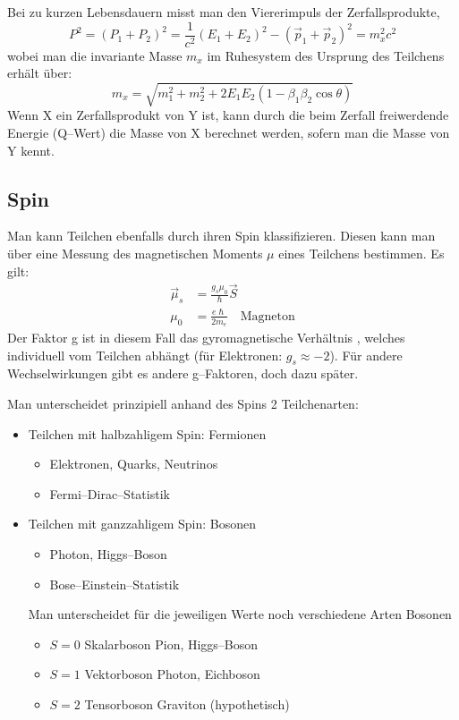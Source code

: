 \documentclass[Ex4_Zusammenfassung.tex]{subfiles}
\begin{document}
Bei zu kurzen Lebensdauern misst man den Viererimpuls der Zerfallsprodukte,
\begin{equation}
	P^2 = (P_1 + P_2)^2 = \frac{1}{c^2}(E_1 + E_2)^2 - (\vec p_1  + \vec p_2 )^2 = m_x^2 c^2
\end{equation}
wobei man die invariante Masse $ m_x $ im Ruhesystem des Ursprung des Teilchens erhält über: 
\begin{equation}
	m_x = \sqrt{m_1^2 + m_2^2 + 2E_1E_2(1-\beta_{1} \beta_{2} \cos \theta ) }
\end{equation}
Wenn X ein Zerfallsprodukt von Y ist, kann durch die beim Zerfall freiwerdende Energie (Q--Wert) die Masse von X berechnet werden, sofern man die Masse von Y kennt.

\subsection{Spin}
Man kann Teilchen ebenfalls durch ihren Spin klassifizieren. 
Diesen kann man über eine Messung des magnetischen Moments $ \mu $ eines Teilchens bestimmen. Es gilt: 
\begin{align}
	\vec \mu_{s} &= \frac{g_s \mu_0 } {\hslash} \vec S \\
	\mu_{0} &= \frac{e \hslash}{2m_e} \quad \text{Magneton}
\end{align}
Der Faktor g ist in diesem Fall das gyromagnetische Verhältnis , welches individuell vom Teilchen abhängt (für Elektronen: $g_s \approx -2$). Für andere Wechselwirkungen gibt es andere g--Faktoren, doch dazu später.

Man unterscheidet prinzipiell anhand des Spins 2 Teilchenarten: 
\begin{itemize}
\item Teilchen mit halbzahligem Spin: Fermionen 
	\begin{itemize}
		\item Elektronen, Quarks, Neutrinos
		\item Fermi--Dirac--Statistik
	\end{itemize}
\item Teilchen mit ganzzahligem Spin: Bosonen
	\begin{itemize}
		\item Photon, Higgs--Boson
		\item Bose--Einstein--Statistik
	\end{itemize}
Man unterscheidet für die jeweiligen Werte noch verschiedene Arten Bosonen
	\begin{itemize}
		\item $S=0$ \qquad Skalarboson \qquad Pion, Higgs--Boson
		\item $S=1$ \qquad Vektorboson \qquad Photon, Eichboson
		\item $S=2$ \qquad Tensorboson \qquad Graviton (hypothetisch)
	\end{itemize}
\end{itemize} 
\end{document}
